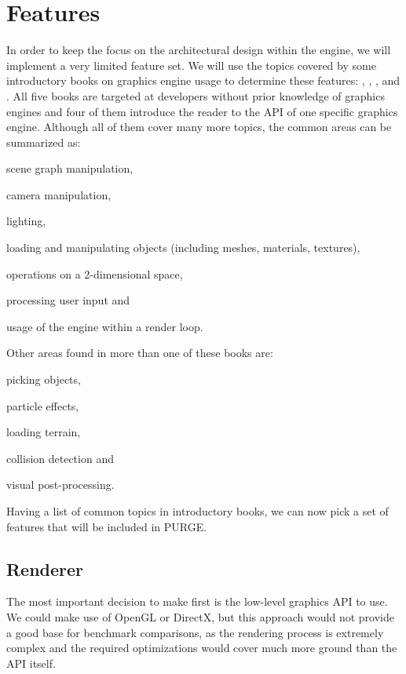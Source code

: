 \section{Features}

	In order to keep the focus on the architectural design within the engine, we will implement a very limited feature set. We will use the topics covered by some introductory books on graphics engine usage to determine these features: \cite{stein2011irrlicht}, \cite{kerger2010ogre}, \cite{mathews2011panda3d}, \cite{Eberly:2006:GED:1214590} and \cite{Martz_2007}. All five books are targeted at developers without prior knowledge of graphics engines and four of them introduce the reader to the API of one specific graphics engine. Although all of them cover many more topics, the common areas can be summarized as:

	\begin{smalllist}
		\item scene graph manipulation,
		\item camera manipulation,
		\item lighting,
		\item loading and manipulating objects (including meshes, materials, textures),
		\item operations on a 2-dimensional space,
		\item processing user input and
		\item usage of the engine within a render loop.
	\end{smalllist}

	Other areas found in more than one of these books are:

	\begin{smalllist}
		\item picking objects,
		\item particle effects,
		\item loading terrain,
		\item collision detection and
		\item visual post-processing.
	\end{smalllist}

	Having a list of common topics in introductory books, we can now pick a set of features that will be included in PURGE.

	\subsection{Renderer}

		The most important decision to make first is the low-level graphics API to use. We could make use of OpenGL or DirectX, but this approach would not provide a good base for benchmark comparisons, as the rendering process is extremely complex and the required optimizations would cover much more ground than the API itself.

